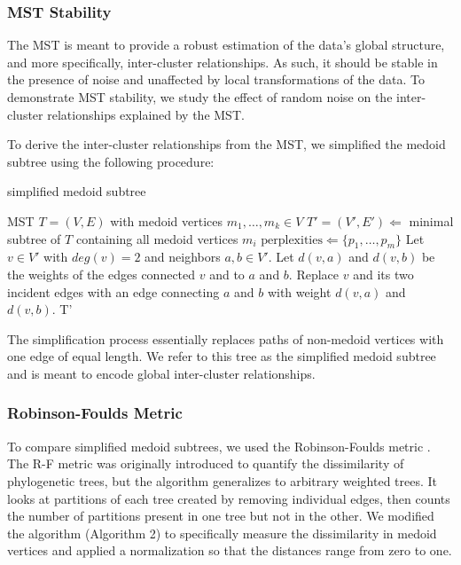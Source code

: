 \documentclass{article}
\begin{document}
\subsubsection{MST Stability}
The MST is meant to provide a robust estimation of the data's global structure, and more specifically, inter-cluster relationships. As such, it should be stable in the presence of noise and unaffected by local transformations of the data. To demonstrate MST stability, we study the effect of random noise on the inter-cluster relationships explained by the MST.

To derive the inter-cluster relationships from the MST, we simplified the medoid subtree using the following procedure:

\begin{algorithm}[H]
\caption{simplified medoid subtree}\label{algo1}
\begin{algorithmic}[1]
\Require MST $T = (V, E)$ with medoid vertices $m_1, \hdots, m_k \in V$
\State $T' = (V', E') \Leftarrow$ minimal subtree of $T$ containing all medoid vertices $m_i$
\State $\textrm{perplexities} \Leftarrow \{p_1, \hdots, p_m\}$
\Repeat
	\State Let $v \in V'$ with $deg(v) = 2$ and neighbors $a, b \in V'$. Let $d(v, a)$ and $d(v, b)$ be the weights of the edges connected $v$ and to $a$ and $b$.
	\State Replace $v$ and its two incident edges with an edge connecting $a$ and $b$ with weight $d(v, a)$ and $d(v, b)$.
\State \Output T'
\end{algorithmic}
\end{algorithm}

The simplification process essentially replaces paths of non-medoid vertices with one edge of equal length. We refer to this tree as the simplified medoid subtree and is meant to encode global inter-cluster relationships.

\subsubsection{Robinson-Foulds Metric}
To compare simplified medoid subtrees, we used the Robinson-Foulds metric \cite{RF metric}. The R-F metric was originally introduced to quantify the dissimilarity of phylogenetic trees, but the algorithm generalizes to arbitrary weighted trees. It looks at partitions of each tree created by removing individual edges, then counts the number of partitions present in one tree but not in the other. We modified the algorithm (Algorithm 2) to specifically measure the dissimilarity in medoid vertices and applied a normalization so that the distances range from zero to one.
\end{document}
